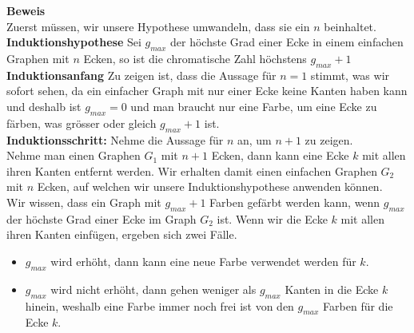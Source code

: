 \documentclass{article}
\begin{document}
\noindent \textbf{Beweis} \\ 
\noindent Zuerst müssen, wir unsere Hypothese umwandeln, dass sie ein \(n\) beinhaltet.\vspace{1mm} \\ 
\noindent \textbf{Induktionshypothese} Sei \(g_{max}\) der höchste Grad einer Ecke in einem einfachen Graphen mit \(n\) Ecken, so ist die chromatische Zahl höchstens \(g_{max}+1\) \vspace{1mm} \\
\noindent \textbf{Induktionsanfang} Zu zeigen ist, dass die Aussage für \(n=1\) stimmt, was wir sofort sehen, da ein einfacher Graph mit nur einer Ecke keine Kanten haben kann und deshalb ist \(g_{max}=0\) und man braucht nur eine Farbe, um eine Ecke zu färben, was grösser oder gleich \(g_{max}+1\) ist.  \vspace{1mm} \\
\noindent \textbf{Induktionsschritt:} Nehme die Aussage für \(n\) an, um \(n+1\) zu zeigen. \\ 
Nehme man einen Graphen \(G_1\) mit \(n+1\) Ecken, dann kann eine Ecke \(k\) mit allen ihren Kanten entfernt werden. Wir erhalten damit einen einfachen Graphen \(G_2\) mit \(n\) Ecken, auf welchen wir unsere Induktionshypothese anwenden können. \\
Wir wissen, dass ein Graph mit \(g_{max}+1\) Farben gefärbt werden kann, wenn \(g_{max}\) der höchste Grad einer Ecke im Graph \(G_2\) ist. Wenn wir die Ecke \(k\) mit allen ihren Kanten einfügen, ergeben sich zwei Fälle.

\begin{itemize}
  \item \(g_{max}\) wird erhöht, dann kann eine neue Farbe verwendet werden für \(k\).
  \item \(g_{max}\) wird nicht erhöht, dann gehen weniger als \(g_{max}\) Kanten in die Ecke \(k\) hinein, weshalb eine Farbe immer noch frei ist von den \(g_{max}\) Farben für die Ecke \(k\). 
\end{itemize}
\end{document}
